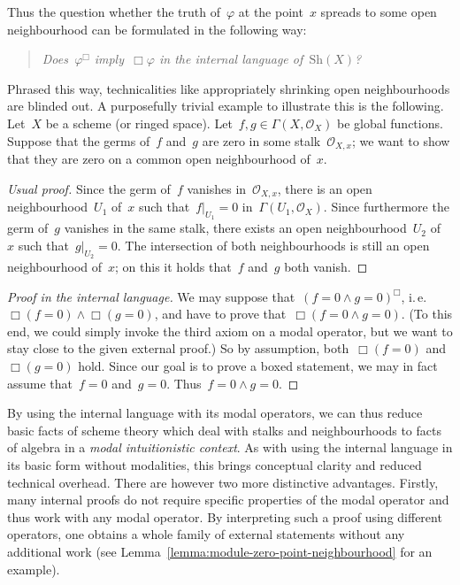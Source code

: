 \documentclass[10pt]{amsart}
\makeatletter
\theoremstyle{definition}
\theoremstyle{plain}
\theoremstyle{remark}
\renewcommand{\O}{\mathcal{O}}
\newcommand{\Sh}{\mathrm{Sh}}
\newcommand{\?}{\,{:}\,}
\renewcommand{\_}{\mathpunct{.}\,}
\newcommand{\ie}{i.\,e.\@\xspace}
\makeatother
\begin{document}
Thus the question whether the truth of~$\varphi$ at the point~$x$ spreads to
some open neighbourhood can be formulated in the following way:
\begin{quote}
\emph{Does~$\varphi^\Box$ imply~$\Box\varphi$ in the internal language
of~$\Sh(X)$?}
\end{quote}
Phrased this way, technicalities like appropriately shrinking open
neighbourhoods are blinded out. A purposefully trivial example to illustrate
this is the following. Let~$X$ be a scheme (or ringed space). Let~$f,g \in
\Gamma(X,\O_X)$ be global functions. Suppose that the germs of~$f$ and~$g$ are
zero in some stalk~$\O_{X,x}$; we want to show that they are zero on a common
open neighbourhood of~$x$.

\begin{proof}[Usual proof]Since the germ of~$f$ vanishes in~$\O_{X,x}$, there
is an open neighbourhood~$U_1$ of~$x$ such that~$f|_{U_1} = 0$
in~$\Gamma(U_1,\O_X)$. Since furthermore the germ of~$g$ vanishes in the same stalk,
there exists an open neighbourhood~$U_2$ of~$x$ such that~$g|_{U_2} = 0$. The
intersection of both neighbourhoods is still an open neighbourhood of~$x$; on
this it holds that~$f$ and~$g$ both vanish.
\end{proof}

\begin{proof}[Proof in the internal language]We may suppose that~$(f = 0 \wedge
g = 0)^\Box$, \ie $\Box(f=0) \wedge \Box(g=0)$, and have to prove
that~$\Box(f=0 \wedge g=0)$. (To this end, we could simply invoke the third
axiom on a modal operator, but we want to stay close to the given external
proof.) So by assumption, both~$\Box(f=0)$ and~$\Box(g=0)$ hold. Since our goal
is to prove a boxed statement, we may in fact assume that~$f = 0$ and~$g = 0$.
Thus~$f = 0 \wedge g = 0$.\end{proof}

By using the internal language with its modal operators, we can thus reduce
basic facts of scheme theory which deal with stalks and neighbourhoods to facts
of algebra in a \emph{modal intuitionistic context}. As with using the internal
language in its basic form without modalities, this brings conceptual clarity
and reduced technical overhead. There are however two more distinctive
advantages. Firstly, many internal proofs do not require specific properties of
the modal operator and thus work with any modal operator. By interpreting such
a proof using different operators, one obtains a whole family of external
statements without any additional work (see
Lemma~\ref{lemma:module-zero-point-neighbourhood} for an example).
\end{document}
